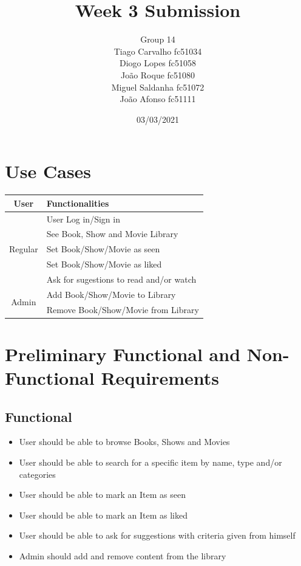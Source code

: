 \documentclass{article}
\title{Week 3 Submission}
\author{Group 14 \\
Tiago Carvalho fc51034 \\
Diogo Lopes fc51058 \\
João Roque fc51080 \\
Miguel Saldanha fc51072 \\
João Afonso fc51111 \\
}
\date{03/03/2021}
\begin{document}
\maketitle

\section{Use Cases}
  \begin{table}[H]
    \centering
    \begin{tabular}{c|l} 
      User & Functionalities \\ \hline
      \multirow{5}{*}{ Regular } 
        & User Log in/Sign in \\
        & See Book, Show and Movie Library \\
        & Set Book/Show/Movie as seen \\
        & Set Book/Show/Movie as liked \\ 
        & Ask for sugestions to read and/or watch  \\ \hline
      \multirow{2}{*}{ Admin } 
        & Add Book/Show/Movie to Library \\
        & Remove Book/Show/Movie from Library
    \end{tabular}
  \end{table}

\section{Preliminary Functional and Non-Functional Requirements}
  
  \subsection{Functional}
    \begin{itemize}
      \item User should be able to browse Books, Shows and Movies
      \item User should be able to search for a specific item by name, type and/or categories
      \item User should be able to mark an Item as seen 
      \item User should be able to mark an Item as liked
      \item User should be able to ask for suggestions with criteria given from himself
      \item Admin should add and remove content from the library
    \end{itemize}
\end{document}
